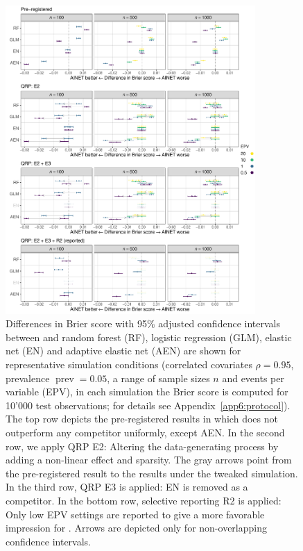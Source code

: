 \begin{figure}[!htb]
  \centering
  \includegraphics[width = 0.85\textwidth]{images/paper6/ainet-results.pdf}
  \caption{Differences in Brier score with 95\% adjusted confidence intervals
    between \ainet{} and random forest (RF), logistic regression (GLM), elastic
    net (EN) and adaptive elastic net (AEN) are shown for representative
    simulation conditions (correlated covariates $\rho = 0.95$, prevalence
    $\operatorname{prev} = 0.05$, a range of sample sizes $n$ and events per
    variable (EPV), in each simulation the Brier score is computed for 10'000
    test observations; for details see Appendix~\ref{app6:protocol}). The
    top row depicts the pre-registered results in which \ainet{} does not
    outperform any competitor uniformly, except AEN. In the second row, we apply
    QRP E2: Altering the data-generating process by adding a non-linear effect
    and sparsity. The gray arrows point from the pre-registered result to the
    results under the tweaked simulation. In the third row, QRP E3 is applied:
    EN is removed as a competitor. In the bottom row, selective reporting R2 is
    applied: Only low EPV settings are reported to give a more favorable
    impression for \ainet{}. Arrows are depicted only for non-overlapping
    confidence intervals. } \label{fig6:E1}
\end{figure}


